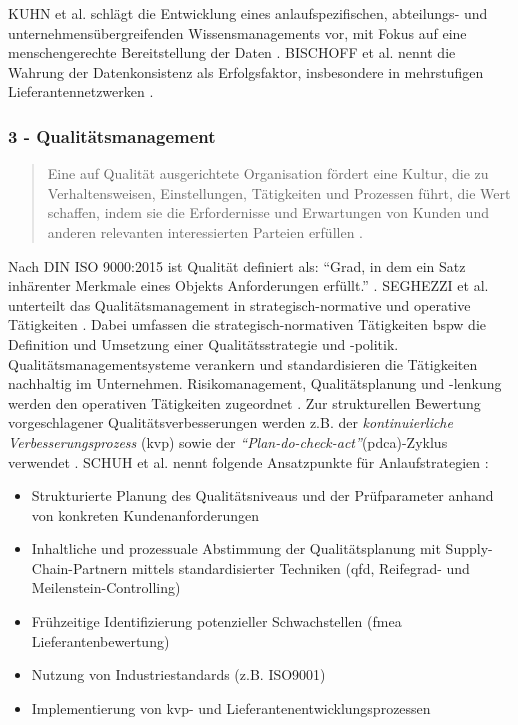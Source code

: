 KUHN et al. schlägt die Entwicklung eines anlaufspezifischen, abteilungs- und unternehmensübergreifenden Wissensmanagements vor, mit Fokus auf eine menschengerechte Bereitstellung der Daten \cite{Kuhn2002}. 
BISCHOFF et al. nennt die Wahrung der Datenkonsistenz als Erfolgsfaktor, insbesondere in mehrstufigen Lieferantennetzwerken \cite{Bischoff2007}. 

\subsubsection*{3 - Qualitätsmanagement}
\begin{quotation}
 Eine auf Qualität ausgerichtete Organisation fördert eine Kultur, die zu Verhaltensweisen, Einstellungen, Tätigkeiten und Prozessen führt, die Wert schaffen, indem sie die Erfordernisse und Erwartungen von Kunden und anderen relevanten interessierten Parteien erfüllen \cite[10]{ISO9000}. %
\end{quotation}

Nach DIN ISO 9000:2015 ist Qualität definiert als: ``Grad, in dem ein Satz inhärenter Merkmale eines Objekts Anforderungen erfüllt.'' \cite[39]{ISO9000}. %
SEGHEZZI et al. unterteilt das Qualitätsmanagement in strategisch-normative und operative Tätigkeiten \cite{Seghezzi2013}. 
Dabei umfassen die strategisch-normativen Tätigkeiten \gls{bspw} die Definition und Umsetzung einer Qualitätsstrategie und -politik. Qualitätsmanagementsysteme verankern und standardisieren die Tätigkeiten nachhaltig im Unternehmen. 
Risikomanagement, Qualitätsplanung und -lenkung werden den operativen Tätigkeiten zugeordnet \cite{Seghezzi2013}. 
Zur strukturellen Bewertung vorgeschlagener Qualitätsverbesserungen werden z.B. der \textit{kontinuierliche Verbesserungsprozess} (\gls{kvp}) sowie der \textit{``Plan-do-check-act''}(\gls{pdca})-Zyklus verwendet \cite[17]{Schuh2008}.
% 
SCHUH et al. nennt folgende Ansatzpunkte für Anlaufstrategien \cite[17]{Schuh2008}: 
\begin{itemize}
 \item Strukturierte Planung des Qualitätsniveaus und der Prüfparameter anhand von konkreten Kundenanforderungen
 \item Inhaltliche und prozessuale Abstimmung der Qualitätsplanung mit Supply-Chain-Partnern mittels standardisierter Techniken (\gls{qfd}, Reifegrad- und Meilenstein-Controlling)
 \item Frühzeitige Identifizierung potenzieller Schwachstellen (\gls{fmea} Lieferantenbewertung)
 \item Nutzung von Industriestandards (z.B. ISO9001)
 \item Implementierung von \gls{kvp}- und Lieferantenentwicklungsprozessen
\end{itemize}

